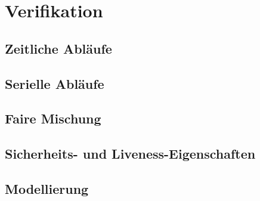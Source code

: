\chapter{Verifikation}

\section{Zeitliche Abläufe}

\section{Serielle Abläufe}

\section{Faire Mischung}

\section{Sicherheits- und Liveness-Eigenschaften}

\section{Modellierung}